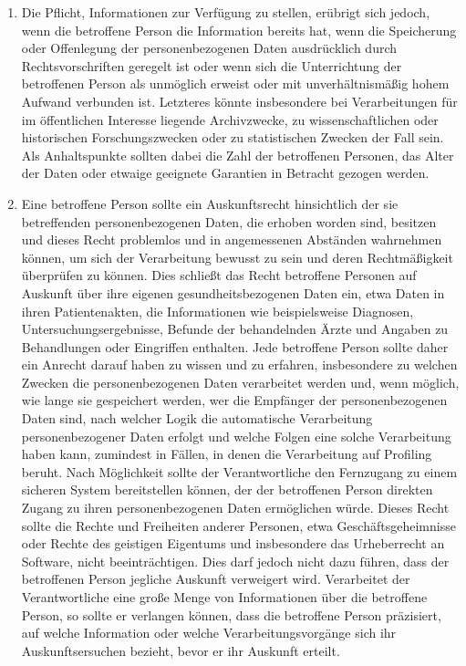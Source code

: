 \begin{enumerate}

   \item Die Pflicht, Informationen zur Verfügung zu stellen, erübrigt sich jedoch, wenn die betroffene Person die
    Information bereits hat, wenn die Speicherung oder Offenlegung der personenbezogenen Daten ausdrücklich durch
    Rechtsvorschriften geregelt ist oder wenn sich die Unterrichtung der betroffenen Person als unmöglich erweist oder
    mit unverhältnismäßig hohem Aufwand verbunden ist. Letzteres könnte insbesondere bei Verarbeitungen für im
    öffentlichen Interesse liegende Archivzwecke, zu wissenschaftlichen oder historischen Forschungszwecken oder zu
    statistischen Zwecken der Fall sein. Als Anhaltspunkte sollten dabei die Zahl der betroffenen Personen, das Alter
    der Daten oder etwaige geeignete Garantien in Betracht gezogen werden.%
   \label{itm:eg-62}
   

   \item Eine betroffene Person sollte ein Auskunftsrecht hinsichtlich der sie betreffenden personenbezogenen Daten, die
    erhoben worden sind, besitzen und dieses Recht problemlos und in angemessenen Abständen wahrnehmen können, um sich
    der Verarbeitung bewusst zu sein und deren Rechtmäßigkeit überprüfen zu können. Dies schließt das Recht betroffene
    Personen auf Auskunft über ihre eigenen gesundheitsbezogenen Daten ein, etwa Daten in ihren Patientenakten, die
    Informationen wie beispielsweise Diagnosen, Untersuchungsergebnisse, Befunde der behandelnden Ärzte und Angaben zu
    Behandlungen oder Eingriffen enthalten. Jede betroffene Person sollte daher ein Anrecht darauf haben zu wissen und
    zu erfahren, insbesondere zu welchen Zwecken die personenbezogenen Daten verarbeitet werden und, wenn möglich, wie
    lange sie gespeichert werden, wer die Empfänger der personenbezogenen Daten sind, nach welcher Logik die
    automatische Verarbeitung personenbezogener Daten erfolgt und welche Folgen eine solche Verarbeitung haben kann,
    zumindest in Fällen, in denen die Verarbeitung auf Profiling beruht. Nach Möglichkeit sollte der Verantwortliche
    den Fernzugang zu einem sicheren System bereitstellen können, der der betroffenen Person direkten Zugang zu ihren
    personenbezogenen Daten ermöglichen würde. Dieses Recht sollte die Rechte und Freiheiten anderer Personen, etwa
    Geschäftsgeheimnisse oder Rechte des geistigen Eigentums und insbesondere das Urheberrecht an Software, nicht
    beeinträchtigen. Dies darf jedoch nicht dazu führen, dass der betroffenen Person jegliche Auskunft verweigert wird.
    Verarbeitet der Verantwortliche eine große Menge von Informationen über die betroffene Person, so sollte er
    verlangen können, dass die betroffene Person präzisiert, auf welche Information oder welche Verarbeitungsvorgänge
    sich ihr Auskunftsersuchen bezieht, bevor er ihr Auskunft erteilt.%
   \label{itm:eg-63}
   

\end{enumerate}

